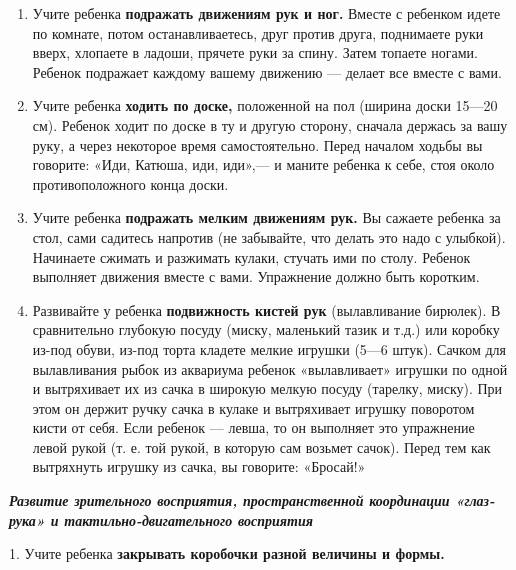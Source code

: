 \documentclass[a5paper]{book}
\renewcommand{\emph}[1]{\textit{#1}}
\begin{document}
\begin{enumerate}
\def\labelenumi{\arabic{enumi}.}
\setcounter{enumi}{1}
\item
  
  Учите ребенка \textbf{подражать движениям рук и ног.} Вместе с
  ребенком идете по комнате, потом останавливаетесь, друг против друга,
  поднимаете руки вверх, хлопаете в ладоши, прячете руки за спину. Затем
  топаете ногами. Ребенок подражает каждому вашему движению --- делает
  все вместе с вами.
  
\item
  
  Учите ребенка \textbf{ходить по доске,} положенной на пол (ширина
  доски 15---20 см). Ребенок ходит по доске в ту и другую сторону,
  сначала держась за вашу руку, а через некоторое время самостоятельно.
  Перед началом ходьбы вы говорите: «Иди, Катюша, иди, иди»,--- и маните
  ребенка к себе, стоя около противоположного конца доски.
  
\item
  
  Учите ребенка \textbf{подражать мелким движениям рук.} Вы сажаете
  ребенка за стол, сами садитесь напротив (не забывайте, что делать это
  надо с улыбкой). Начинаете сжимать и разжимать кулаки, стучать ими по
  столу. Ребенок выполняет движения вместе с вами. Упражнение должно
  быть коротким.
  
\item
  
  Развивайте у ребенка \textbf{подвижность кистей рук} (вылавливание
  бирюлек). В сравнительно глубокую посуду (миску, маленький тазик и
  т.д.) или коробку из-под обуви, из-под торта кладете мелкие игрушки
  (5---6 штук). Сачком для вылавливания рыбок из аквариума ребенок
  «вылавливает» игрушки по одной и вытряхивает их из сачка в широкую
  мелкую посуду (тарелку, миску). При этом он держит ручку сачка в
  кулаке и вытряхивает игрушку поворотом кисти от себя. Если ребенок ---
  левша, то он выполняет это упражнение левой рукой (т. е. той рукой, в
  которую сам возьмет сачок). Перед тем как вытряхнуть игрушку из сачка,
  вы говорите: «Бросай!»
  
\end{enumerate}


\emph{\textbf{Развитие зрительного восприятия, пространственной
координации «глаз-рука» и тактильно-двигательного восприятия}}

1. Учите ребенка \textbf{закрывать коробочки разной величины и формы.}
\end{document}
